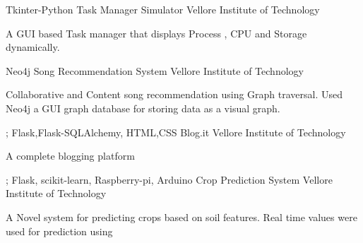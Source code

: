 \documentclass[11pt, a4paper]{awesome-cv}
\begin{document}


\begin{cventries}

    \cventry
    {Tkinter-Python} %
    {Task Manager Simulator} %
    {Vellore Institute of Technology} %
    {} %
    {
      \begin{cvitems} %
        \item {A GUI based Task manager that displays Process , CPU and Storage dynamically.}
      \end{cvitems}
    }
    \cventry
    {Neo4j} %
    {Song Recommendation System} %
    {Vellore Institute of Technology} %
    {} %
    {
      \begin{cvitems} %
        \item {Collaborative and Content song recommendation using Graph traversal. Used Neo4j a GUI graph database for storing data as a visual graph.}
      \end{cvitems}
    }
    \newline;
    \cventry
    {Flask,Flask-SQLAlchemy, HTML,CSS} %
    {Blog.it} %
    {Vellore Institute of Technology} %
    {} %
    {
      \begin{cvitems} %
        \item {A complete blogging platform }
      \end{cvitems}
    }
    \newline;
    \cventry
    {Flask, scikit-learn, Raspberry-pi, Arduino} %
    {Crop Prediction System} %
    {Vellore Institute of Technology} %
    {} %
    {
      \begin{cvitems} %
        \item {A Novel system for predicting crops based on soil features. Real time values were used for prediction using
}
\end{cvitems}}
\end{cventries}
\end{document}

